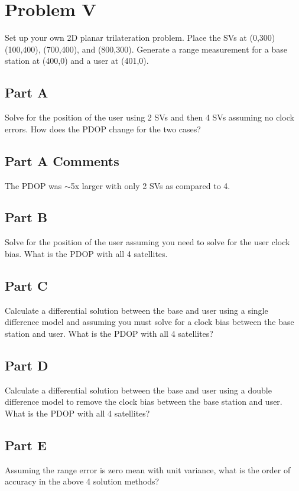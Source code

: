 \documentclass{article}
\begin{document}
\section*{Problem V}
Set up your own 2D planar trilateration problem. Place the SVs at (0,300) (100,400),
(700,400), and (800,300). Generate a range measurement for a base station at (400,0) and a
user at (401,0).

\subsection*{Part A}
Solve for the position of the user using 2 SVs and then 4 SVs assuming no clock
errors. How does the PDOP change for the two cases?

\subsection*{Part A Comments}
The PDOP was $\sim$5x larger with only 2 SVs as compared to 4.

\subsection*{Part B}
Solve for the position of the user assuming you need to solve for the user clock bias.
What is the PDOP with all 4 satellites.

\subsection*{Part C}
Calculate a differential solution between the base and user using a single difference
model and assuming you must solve for a clock bias between the base station and
user. What is the PDOP with all 4 satellites?

\subsection*{Part D}
Calculate a differential solution between the base and user using a double difference
model to remove the clock bias between the base station and user. What is the PDOP
with all 4 satellites?

\subsection*{Part E}
Assuming the range error is zero mean with unit variance, what is the order of
accuracy in the above 4 solution methods?
\end{document}
